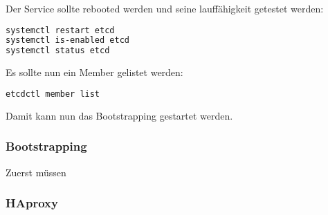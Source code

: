 Der Service sollte rebooted werden und seine lauffähigkeit getestet werden:
\lstset{style=gra_codestyle}
\begin{lstlisting}[language=bash, caption=Patroni - etcd-server reboot=b,label={lst:patroni-etcd-server-reboot},breaklines=true]
systemctl restart etcd
systemctl is-enabled etcd
systemctl status etcd
\end{lstlisting}
Es sollte nun ein Member gelistet werden:
\lstset{style=gra_codestyle}
\begin{lstlisting}[language=bash, caption=Patroni - etcd-server list menber=b,label={lst:patroni-etcd-server-list-member},breaklines=true]
etcdctl member list
\end{lstlisting}
Damit kann nun das Bootstrapping gestartet werden.

\subsubsection{Bootstrapping}
Zuerst müssen
\subsubsection{HAproxy}
